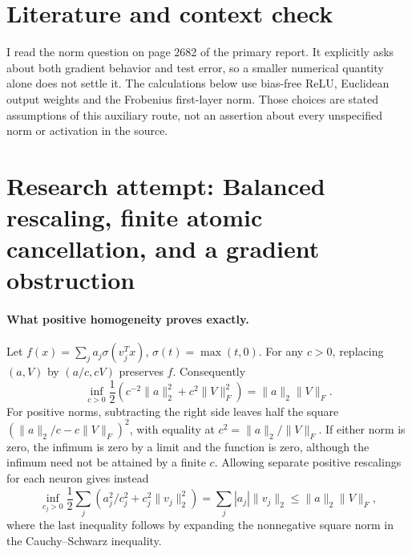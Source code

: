 \documentclass[11pt]{article}
\begin{document}
\section{Literature and context check}

I read the norm question on page 2682 of the primary report. It explicitly asks
about both gradient behavior and test error, so a smaller numerical quantity
alone does not settle it. The calculations below use bias-free ReLU, Euclidean
output weights and the Frobenius first-layer norm. Those choices are stated
assumptions of this auxiliary route, not an assertion about every unspecified
norm or activation in the source.

\section{Research attempt: Balanced rescaling, finite atomic cancellation, and a gradient obstruction}

\paragraph{What positive homogeneity proves exactly.}
Let $f(x)=\sum_j a_j\sigma(v_j^Tx)$, $\sigma(t)=\max(t,0)$.
For any $c>0$, replacing $(a,V)$ by $(a/c,cV)$ preserves $f$.
Consequently
\[
 \inf_{c>0}\frac12(c^{-2}\|a\|_2^2+c^2\|V\|_F^2)
 =\|a\|_2\|V\|_F.
\]
For positive norms, subtracting the right side leaves half the square
$(\|a\|_2/c-c\|V\|_F)^2$, with equality at
$c^2=\|a\|_2/\|V\|_F$. If either norm is zero, the infimum is zero by a
limit and the function is zero, although the infimum need not be attained by a
finite $c$. Allowing separate positive rescalings for each neuron gives instead
\[
 \inf_{c_j>0}\frac12\sum_j(a_j^2/c_j^2+c_j^2\|v_j\|_2^2)
 =\sum_j |a_j|\|v_j\|_2
 \leq\|a\|_2\|V\|_F,
\]
where the last inequality follows by expanding the nonnegative square norm
in the Cauchy--Schwarz inequality.
\end{document}
